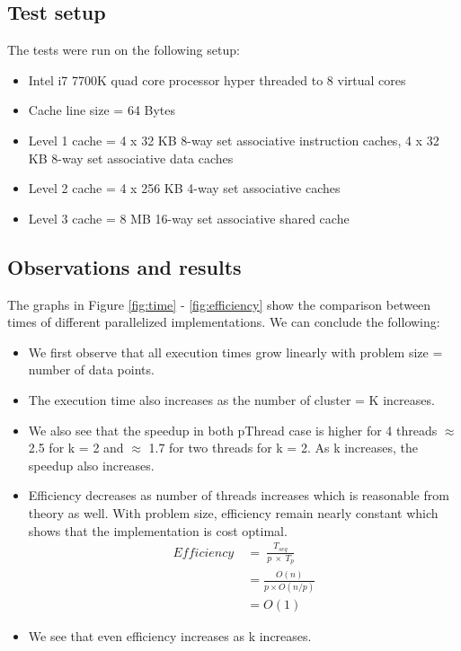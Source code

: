 \documentclass[a4paper, 11pt, margin=1in]{article}
\begin{document}
\subsection{Test setup}
The tests were run on the following setup:
\begin{itemize}
    \item Intel i7 7700K quad core processor hyper threaded to 8 virtual cores
    \item Cache line size = 64 Bytes
    \item Level 1 cache = 4 x 32 KB 8-way set associative instruction caches, 4 x 32 KB 8-way set associative data caches
    \item Level 2 cache = 4 x 256 KB 4-way set associative caches
    \item Level 3 cache = 8 MB 16-way set associative shared cache
\end{itemize}

\subsection{Observations and results}

The graphs in Figure \ref{fig:time} - \ref{fig:efficiency} show the comparison between times of different parallelized implementations. We can conclude the following:

\begin{itemize}
    \item We first observe that all execution times grow linearly with problem size = number of data points.
    \item The execution time also increases as the number of cluster = K increases.
    \item We also see that the speedup in both pThread case is higher for 4 threads $\approx$ 2.5 for k = 2 and $\approx$ 1.7 for two threads for k = 2. As k increases, the speedup also increases.
    \item Efficiency decreases as number of threads increases which is reasonable from theory as well. With problem size, efficiency remain nearly constant which shows that the implementation is cost optimal. \\
    \begin{align*}
        Efficiency\ &=\ \frac{T_{seq}}{p\ \times\ T_p}\\
        &= \frac{O(n)}{p \times O(n/p)}\\
        &= O(1)
    \end{align*}
    \item We see that even efficiency increases as k increases.
\end{itemize}
\end{document}
